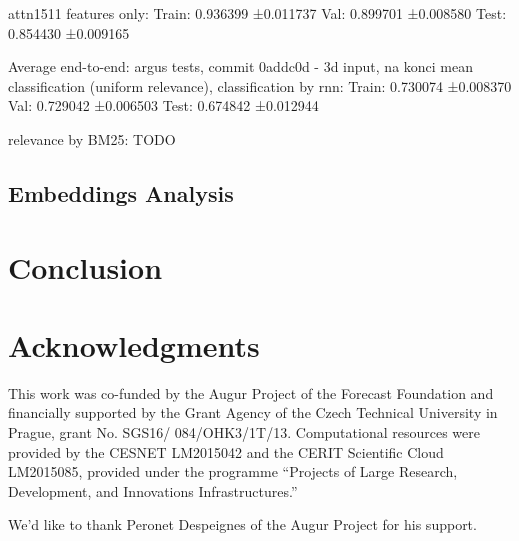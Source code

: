 \documentclass[11pt]{article}
\begin{document}
attn1511 features only:
Train: 0.936399 ±0.011737
Val: 0.899701 ±0.008580
Test: 0.854430 ±0.009165

Average end-to-end: argus tests, commit 0addc0d - 3d input, na konci mean
classification (uniform relevance), classification by rnn:
Train: 0.730074 ±0.008370
Val: 0.729042 ±0.006503
Test: 0.674842 ±0.012944

relevance by BM25:
TODO

\subsection{Embeddings Analysis}

\section{Conclusion}
\label{sec:concl}


\section*{Acknowledgments}
{\footnotesize
	This work was co-funded by the Augur Project of the Forecast Foundation
and financially supported by the Grant Agency of the Czech Technical
University in Prague, grant No. SGS16/ 084/OHK3/1T/13.
Computational resources were provided by the CESNET LM2015042 and the CERIT Scientific Cloud LM2015085,
provided under the programme ``Projects of Large Research, Development, and Innovations Infrastructures.''

We'd like to thank Peronet Despeignes of the Augur Project for his support.}



\end{document}
